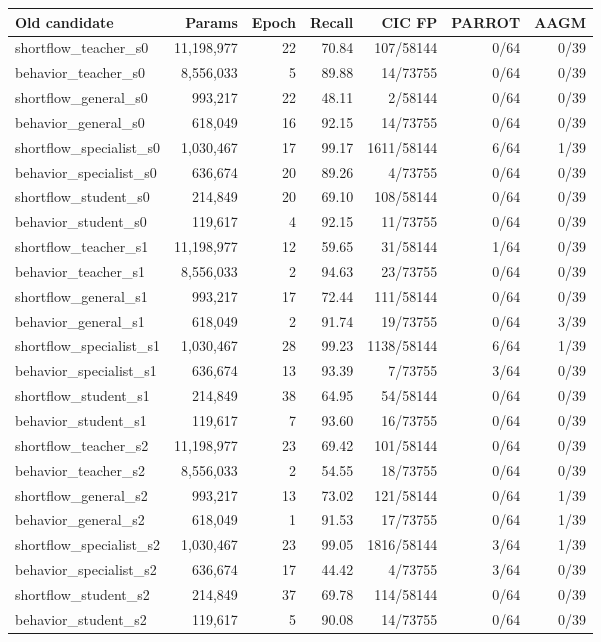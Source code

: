 \documentclass[11pt,a4paper,oneside]{report}
\begin{document}
{\small
\begin{longtable}{@{}p{}rrrrrr@{}}
\toprule
Old candidate & Params & Epoch & Recall & CIC FP & PARROT & AAGM\\\midrule\endhead
shortflow\_teacher\_s0 & 11,198,977 & 22 & 70.84 & 107/58144 & 0/64 & 0/39\\
behavior\_teacher\_s0 & 8,556,033 & 5 & 89.88 & 14/73755 & 0/64 & 0/39\\
shortflow\_general\_s0 & 993,217 & 22 & 48.11 & 2/58144 & 0/64 & 0/39\\
behavior\_general\_s0 & 618,049 & 16 & 92.15 & 14/73755 & 0/64 & 0/39\\
shortflow\_specialist\_s0 & 1,030,467 & 17 & 99.17 & 1611/58144 & 6/64 & 1/39\\
behavior\_specialist\_s0 & 636,674 & 20 & 89.26 & 4/73755 & 0/64 & 0/39\\
shortflow\_student\_s0 & 214,849 & 20 & 69.10 & 108/58144 & 0/64 & 0/39\\
behavior\_student\_s0 & 119,617 & 4 & 92.15 & 11/73755 & 0/64 & 0/39\\
shortflow\_teacher\_s1 & 11,198,977 & 12 & 59.65 & 31/58144 & 1/64 & 0/39\\
behavior\_teacher\_s1 & 8,556,033 & 2 & 94.63 & 23/73755 & 0/64 & 0/39\\
shortflow\_general\_s1 & 993,217 & 17 & 72.44 & 111/58144 & 0/64 & 0/39\\
behavior\_general\_s1 & 618,049 & 2 & 91.74 & 19/73755 & 0/64 & 3/39\\
shortflow\_specialist\_s1 & 1,030,467 & 28 & 99.23 & 1138/58144 & 6/64 & 1/39\\
behavior\_specialist\_s1 & 636,674 & 13 & 93.39 & 7/73755 & 3/64 & 0/39\\
shortflow\_student\_s1 & 214,849 & 38 & 64.95 & 54/58144 & 0/64 & 0/39\\
behavior\_student\_s1 & 119,617 & 7 & 93.60 & 16/73755 & 0/64 & 0/39\\
shortflow\_teacher\_s2 & 11,198,977 & 23 & 69.42 & 101/58144 & 0/64 & 0/39\\
behavior\_teacher\_s2 & 8,556,033 & 2 & 54.55 & 18/73755 & 0/64 & 0/39\\
shortflow\_general\_s2 & 993,217 & 13 & 73.02 & 121/58144 & 0/64 & 1/39\\
behavior\_general\_s2 & 618,049 & 1 & 91.53 & 17/73755 & 0/64 & 1/39\\
shortflow\_specialist\_s2 & 1,030,467 & 23 & 99.05 & 1816/58144 & 3/64 & 1/39\\
behavior\_specialist\_s2 & 636,674 & 17 & 44.42 & 4/73755 & 3/64 & 0/39\\
shortflow\_student\_s2 & 214,849 & 37 & 69.78 & 114/58144 & 0/64 & 0/39\\
behavior\_student\_s2 & 119,617 & 5 & 90.08 & 14/73755 & 0/64 & 0/39\\
\bottomrule\end{longtable}
}
\end{document}
